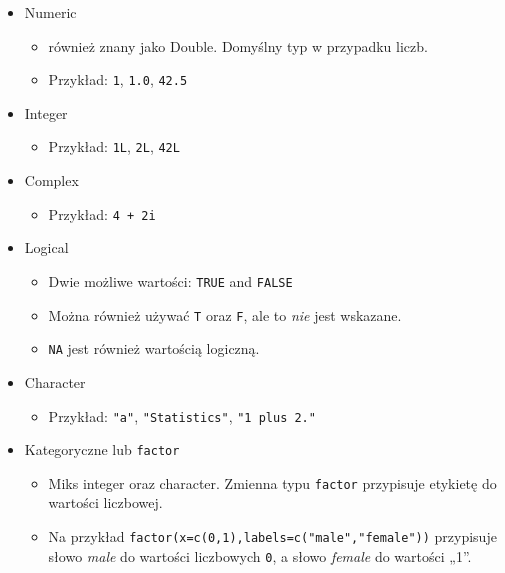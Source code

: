 \documentclass[
]{article}
\providecommand{\tightlist}{%
  \setlength{\itemsep}{0pt}\setlength{\parskip}{0pt}}
\begin{document}
\begin{itemize}
\tightlist
\item
  Numeric

  \begin{itemize}
  \tightlist
  \item
    również znany jako Double. Domyślny typ w przypadku liczb.
  \item
    Przykład: \texttt{1}, \texttt{1.0}, \texttt{42.5}
  \end{itemize}
\item
  Integer

  \begin{itemize}
  \tightlist
  \item
    Przykład: \texttt{1L}, \texttt{2L}, \texttt{42L}
  \end{itemize}
\item
  Complex

  \begin{itemize}
  \tightlist
  \item
    Przykład: \texttt{4\ +\ 2i}
  \end{itemize}
\item
  Logical

  \begin{itemize}
  \tightlist
  \item
    Dwie możliwe wartości: \texttt{TRUE} and \texttt{FALSE}
  \item
    Można również używać \texttt{T} oraz \texttt{F}, ale to \emph{nie}
    jest wskazane.
  \item
    \texttt{NA} jest również wartością logiczną.
  \end{itemize}
\item
  Character

  \begin{itemize}
  \tightlist
  \item
    Przykład: \texttt{"a"}, \texttt{"Statistics"},
    \texttt{"1\ plus\ 2."}
  \end{itemize}
\item
  Kategoryczne lub \texttt{factor}

  \begin{itemize}
  \tightlist
  \item
    Miks integer oraz character. Zmienna typu \texttt{factor} przypisuje
    etykietę do wartości liczbowej.
  \item
    Na przykład \texttt{factor(x=c(0,1),labels=c("male","female"))}
    przypisuje słowo \emph{male} do wartości liczbowych \texttt{0}, a
    słowo \emph{female} do wartości „1''.
  \end{itemize}
\end{itemize}
\end{document}
